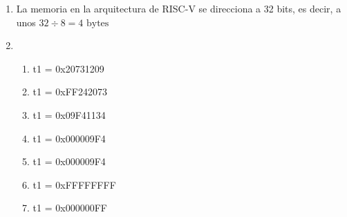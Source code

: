     \begin{enumerate}
        \item La memoria en la arquitectura de RISC-V se direcciona a 32 bits, es decir, a unos $32 \div 8 = 4 \text{ bytes}$

        \item 

        \begin{enumerate}
            \item t1 = 0x20731209
            \item t1 = 0xFF242073 
            \item t1 = 0x09F41134
            \item t1 = 0x000009F4
            \item t1 = 0x000009F4
            \item t1 = 0xFFFFFFFF
            \item t1 = 0x000000FF
        \end{enumerate}
    \end{enumerate}